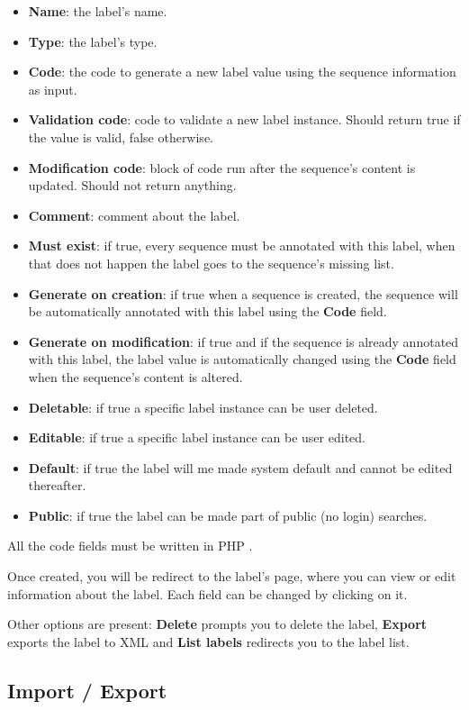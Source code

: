 \begin{itemize}
  \item \textbf{Name}: the label's name.
  \item \textbf{Type}: the label's type.
  \item \textbf{Code}: the code to generate a new label value using the sequence information as input.
  \item \textbf{Validation code}: code to validate a new label instance. Should return true if the value is valid, false otherwise.
  \item \textbf{Modification code}: block of code run after the sequence's content is updated. Should not return anything.
  \item \textbf{Comment}: comment about the label.
  \item \textbf{Must exist}: if true, every sequence must be annotated with this label, when that does not happen the label goes to the sequence's missing list.
  \item \textbf{Generate on creation}: if true when a sequence is created, the sequence will be automatically annotated with this label using the \textbf{Code} field.
  \item \textbf{Generate on modification}: if true and if the sequence is already annotated with this label, the label value is automatically changed using the \textbf{Code} field when the sequence's content is altered.
  \item \textbf{Deletable}: if true a specific label instance can be user deleted.
  \item \textbf{Editable}: if true a specific label instance can be user edited.
  \item \textbf{Default}: if true the label will me made system default and cannot be edited thereafter.
  \item \textbf{Public}: if true the label can be made part of public (no login) searches. 
\end{itemize}

All the code fields must be written in PHP \cite{php}.

Once created, you will be redirect to the label's page, where you can view or edit information about
the label. Each field can be changed by clicking on it.

Other options are present: \textbf{Delete} prompts you to delete the label, \textbf{Export} exports the label
to XML and \textbf{List labels} redirects you to the label list.

\subsection{Import / Export}

